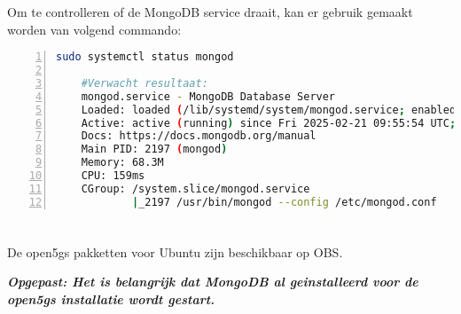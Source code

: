 Om te controlleren of de MongoDB service draait, kan er gebruik gemaakt worden van volgend commando:



\begin{lstlisting}[basicstyle=\small, frame=single, breaklines=true, postbreak=\mbox{\textcolor{red}{$\hookrightarrow$}\space}, escapeinside ={\%,}, escapechar={!}, numbers=left, language=sh, caption=Controle MongoDB status]
    sudo systemctl status mongod

    #Verwacht resultaat:
    mongod.service - MongoDB Database Server
    Loaded: loaded (/lib/systemd/system/mongod.service; enabled; vendor pr>
    Active: active (running) since Fri 2025-02-21 09:55:54 UTC; 24s ago
    Docs: https://docs.mongodb.org/manual
    Main PID: 2197 (mongod)
    Memory: 68.3M
    CPU: 159ms
    CGroup: /system.slice/mongod.service
            |_2197 /usr/bin/mongod --config /etc/mongod.conf
\end{lstlisting}

\section{}

De \gls{open5gs} pakketten voor Ubuntu zijn beschikbaar op OBS. 

\textit{\textbf{Opgepast: Het is belangrijk dat MongoDB al geinstalleerd voor de \gls{open5gs} installatie wordt gestart.}} \autocite{Lee2025a}


    
